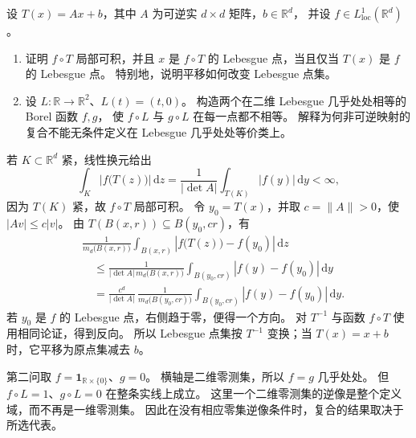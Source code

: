 \begin{exercise}\label{b1:ex:14-affine-lebesgue-points}
设 \(T(x)=Ax+b\)，其中 \(A\) 为可逆实 \(d\times d\) 矩阵，\(b\in\mathbb R^d\)，
并设 \(f\in L^1_{\mathrm{loc}}(\mathbb R^d)\)。
\begin{enumerate}
\item\label{b1:item:14-affine-invariance}
证明 \(f\circ T\) 局部可积，并且 \(x\) 是 \(f\circ T\) 的 Lebesgue 点，当且仅当 \(T(x)\) 是 \(f\) 的 Lebesgue 点。
特别地，说明平移如何改变 Lebesgue 点集。
\item\label{b1:item:14-singular-pullback}
设 \(L\colon\mathbb R\to\mathbb R^2\)、\(L(t)=(t,0)\)。
构造两个在二维 Lebesgue 几乎处处相等的 Borel 函数 \(f,g\)，
使 \(f\circ L\) 与 \(g\circ L\) 在每一点都不相等。
解释为何非可逆映射的复合不能无条件定义在 Lebesgue 几乎处处等价类上。
\end{enumerate}
\end{exercise}
\begin{solution}
若 \(K\subset\mathbb R^d\) 紧，线性换元给出
\[
 \int_K|f\bigl(T(z)\bigr)|\,\mathrm dz
 =\frac1{|\det A|}\int_{T(K)}|f(y)|\,\mathrm dy<\infty,
\]
因为 \(T(K)\) 紧，故 \(f\circ T\) 局部可积。
令 \(y_0=T(x)\)，并取 \(c=\|A\|>0\)，使 \(|Av|\leq c|v|\)。
由 \(T(B(x,r))\subseteq B(y_0,cr)\)，有
\[
 \begin{aligned}
 &\frac1{m_d\bigl(B(x,r)\bigr)}
    \int_{B(x,r)}|f\bigl(T(z)\bigr)-f(y_0)|\,\mathrm dz\\
 &\quad\leq
 \frac1{|\det A|\,m_d\bigl(B(x,r)\bigr)}
    \int_{B(y_0,cr)}|f(y)-f(y_0)|\,\mathrm dy\\
 &\quad=
 \frac{c^d}{|\det A|}\,
 \frac1{m_d\bigl(B(y_0,cr)\bigr)}
    \int_{B(y_0,cr)}|f(y)-f(y_0)|\,\mathrm dy.
 \end{aligned}
\]
若 \(y_0\) 是 \(f\) 的 Lebesgue 点，右侧趋于零，便得一个方向。
对 \(T^{-1}\) 与函数 \(f\circ T\) 使用相同论证，得到反向。
所以 Lebesgue 点集按 \(T^{-1}\) 变换；当 \(T(x)=x+b\) 时，它平移为原点集减去 \(b\)。

第二问取 \(f=\mathbf1_{\mathbb R\times\{0\}}\)、\(g=0\)。
横轴是二维零测集，所以 \(f=g\) 几乎处处。
但 \(f\circ L=1\)、\(g\circ L=0\) 在整条实线上成立。
这里一个二维零测集的逆像是整个定义域，而不再是一维零测集。
因此在没有相应零集逆像条件时，复合的结果取决于所选代表。
\end{solution}


